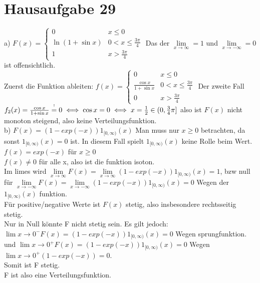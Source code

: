 \documentclass{article}
\newcommand\stackequal[2]{%
  \mathrel{\stackunder[2pt]{\stackon[4pt]{=}{$\scriptscriptstyle#1$}}{%
  $\scriptscriptstyle#2$}}
 }
\begin{document}
	\section{Hausaufgabe 29}
	a) $F(x)=\begin{cases}0&x\leq 0\\
	\ln(1+\sin x)& 0<x\leq\frac{3\pi}{4}\\
	1 &x>\frac{3\pi}{4}
	\end{cases}$
	Das der $\lim\limits_{x\to\infty}=1$ und $\lim\limits_{x\to-\infty}=0$ ist offensichtlich.\\
	Zuerst die Funktion ableiten: $f(x)=\begin{cases}0&x\leq 0\\
	\frac{\cos x}{1+\sin x}& 0<x\leq\frac{3\pi}{4}\\
	0 &x>\frac{3\pi}{4}
	\end{cases}$
	Der zweite Fall $f_2(x)=\frac{\cos x}{1+\sin x}\stackequal{!}{}0\iff \cos x =0\iff x=\frac{1}{2}\in(0,\frac{3}{4}\pi]$ also ist $F(x)$ nicht monoton steigend, also keine Verteilungsfunktion.\\
	b) $F(x)=(1-exp(-x))1_{[0,\infty)}(x)$
	Man muss nur $x\geq0$ betrachten, da sonst $1_{[0,\infty)}(x)=0$ ist. In diesem Fall spielt $1_{[0,\infty)}(x)$ keine Rolle beim Wert.\\
	$f(x) = exp(-x)$ für $x\geq 0$\\
	$f(x)\neq 0$ für alle x, also ist die funktion isoton.\\
	Im limes wird $\lim\limits_{x\to\infty} F(x)=\lim\limits_{x\to\infty} (1-exp(-x))1_{[0,\infty)}(x) = 1$, bzw null für $\lim\limits_{x\to-\infty} F(x)=\lim\limits_{x\to-\infty} (1-exp(-x))1_{[0,\infty)}(x)=0$ Wegen der $1_{[0,\infty)}(x)$ funktion.\\
	Für positive/negative Werte ist $F(x)$ stetig, also insbesondere rechtsseitig stetig.\\
	Nur in Null könnte F nicht stetig sein. Es gilt jedoch:\\
	$\lim\limits{x\to0^-} F(x) = (1-exp(-x))1_{[0,\infty)}(x)=0 $ Wegen sprungfunktion.\\
	und $\lim\limits{x\to0^+} F(x) = (1-exp(-x))1_{[0,\infty)}(x)=0 $ Wegen $\lim\limits{x\to0^+}(1-exp(-x))=0$.\\
	Somit ist F stetig.\\
	F ist also eine Verteilungsfunktion.\\
\end{document}
